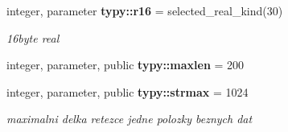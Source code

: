 \begin{DoxyCompactItemize}
integer, parameter {\bf typy\+::r16} = selected\+\_\+real\+\_\+kind(30)
\begin{DoxyCompactList}\small\item\em 16byte real \end{DoxyCompactList}\item 
integer, parameter, public {\bf typy\+::maxlen} = 200
\item 
integer, parameter, public {\bf typy\+::strmax} = 1024
\begin{DoxyCompactList}\small\item\em maximalni delka retezce jedne polozky beznych dat \end{DoxyCompactList}\end{DoxyCompactItemize}

